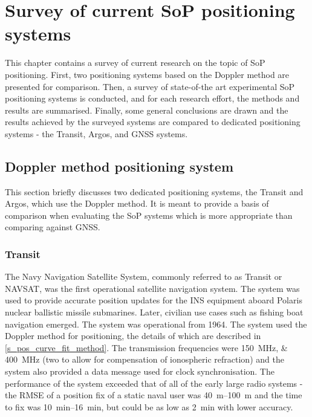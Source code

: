 \chapter{Survey of current SoP positioning systems}
\label{s_sop}
This chapter contains a survey of current research on the topic of SoP positioning. First, two positioning systems based on the Doppler method are presented for comparison. Then, a survey of state-of-the art experimental SoP positioning systems is conducted, and for each research effort, the methods and results are summarised. Finally, some general conclusions are drawn and the results achieved by the surveyed systems are compared to dedicated positioning systems - the Transit, Argos, and GNSS systems.



\section{Doppler method positioning system}
\label{s_sop_dopp_systems}
This section briefly discusses two dedicated positioning systems, the Transit and Argos, which use the Doppler method. It is meant to provide a basis of comparison when evaluating the SoP systems which is more appropriate than comparing against GNSS.


\subsection{Transit}
The Navy Navigation Satellite System, commonly referred to as Transit or NAVSAT, was the first operational satellite navigation system. The system was used to provide accurate position updates for the INS equipment aboard Polaris nuclear ballistic missile submarines. Later, civilian use cases such as fishing boat navigation emerged. The system was operational from 1964. The system used the Doppler method for positioning, the details of which are described in \autoref{s_pos_curve_fit_method}. The transmission frequencies were \qtylist{150;400}{MHz} (two to allow for compensation of ionospheric refraction) and the system also provided a data message used for clock synchronisation. The performance of the system exceeded that of all of the early large radio systems - the RMSE of a position fix of a static naval user was \qtyrange{40}{100}{m} and the time to fix was \qtyrange{10}{16}{min}, but could be as low as \qty{2}{min} with lower accuracy\cite{sat16}.

